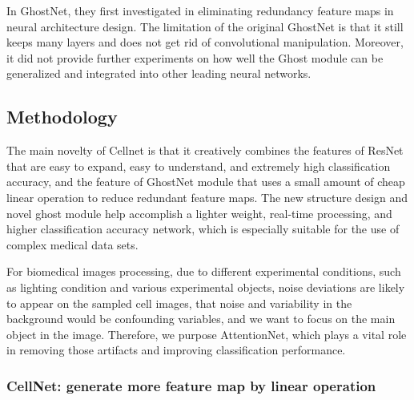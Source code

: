 In GhostNet\cite{19}, they first investigated in eliminating redundancy feature maps in neural architecture design. The limitation of the original GhostNet \cite{19} is that it still keeps many layers and does not get rid of convolutional manipulation. Moreover, it did not provide further experiments on how well the Ghost module can be generalized and integrated into other leading neural networks.

\subsection{Methodology}
The main novelty of Cellnet is that it creatively combines the features of ResNet\cite{20} that are easy to expand, easy to understand, and extremely high classification accuracy, and the feature of GhostNet\cite{19} module that uses a small amount of cheap linear operation to reduce redundant feature maps. The new structure design and novel ghost module help accomplish a lighter weight, real-time processing, and higher classification accuracy network, which is especially suitable for the use of complex medical data sets.

For biomedical images processing, due to different experimental conditions, such as lighting condition and various experimental objects, noise deviations are likely to appear on the sampled cell images\cite{6}\cite{7}, that noise and variability in the background would be confounding variables, and we want to focus on the main object in the image. Therefore, we purpose AttentionNet, which plays a vital role in removing those artifacts and improving classification performance.

\subsubsection{CellNet: generate more feature map by linear operation}


